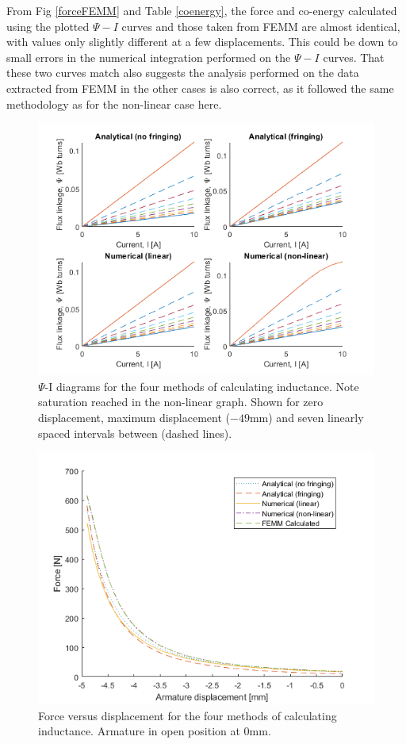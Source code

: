 \documentclass[a4paper]{IEEEtran}
\begin{document}
    From Fig \ref{forceFEMM} and Table \ref{coenergy}, the force and co-energy calculated using the plotted \(\Psi-I\) curves and those taken from FEMM are almost identical, with values only slightly different at a few displacements. This could be down to small errors in the numerical integration performed on the \(\Psi-I\) curves. That these two curves match also suggests the analysis performed on the data extracted from FEMM in the other cases is also correct, as it followed the same methodology as for the non-linear case here.


    \begin{figure}[ht]
        \includegraphics[width = \linewidth]{psi-I-diagrams.png}
        \caption{$\Psi$-I diagrams for the four methods of calculating inductance. Note saturation reached in the non-linear graph. Shown for zero displacement, maximum displacement ($-49$mm) and seven linearly spaced intervals between (dashed lines).}
        \label{psi-eye} 
    \end{figure}

    \begin{figure}[ht]
        \includegraphics[width = \linewidth]{F-x.png}
        \caption{Force versus displacement for the four methods of calculating inductance. Armature in open position at 0mm.}
        \label{forceGraph} 
    \end{figure}
\end{document}
